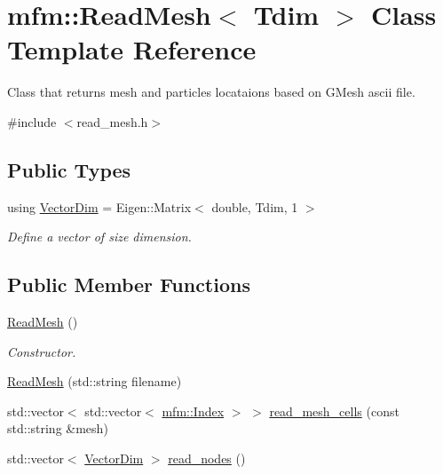 \hypertarget{classmfm_1_1_read_mesh}{}\section{mfm\+:\+:Read\+Mesh$<$ Tdim $>$ Class Template Reference}
\label{classmfm_1_1_read_mesh}


Class that returns mesh and particles locataions based on G\+Mesh ascii file.  




{\ttfamily \#include $<$read\+\_\+mesh.\+h$>$}

\subsection*{Public Types}
\begin{DoxyCompactItemize}
\item 
\mbox{\label{classmfm_1_1_read_mesh_a0dcd4f554ae2784be3fa53e547b2f6a9}} 
using \hyperlink{classmfm_1_1_read_mesh_a0dcd4f554ae2784be3fa53e547b2f6a9}{Vector\+Dim} = Eigen\+::\+Matrix$<$ double, Tdim, 1 $>$
\begin{DoxyCompactList}\small\item\em Define a vector of size dimension. \end{DoxyCompactList}\end{DoxyCompactItemize}
\subsection*{Public Member Functions}
\begin{DoxyCompactItemize}
\item 
\mbox{\label{classmfm_1_1_read_mesh_aca466723f1ea120fc76ec8cee2e62a98}} 
\hyperlink{classmfm_1_1_read_mesh_aca466723f1ea120fc76ec8cee2e62a98}{Read\+Mesh} ()
\begin{DoxyCompactList}\small\item\em Constructor. \end{DoxyCompactList}\item 
\hyperlink{classmfm_1_1_read_mesh_a205f0231970ab4511eb07ba7ecfcff47}{Read\+Mesh} (std\+::string filename)
\item 
std\+::vector$<$ std\+::vector$<$ \hyperlink{namespacemfm_a7d021c8caa1852f673d78358edc6b7f9}{mfm\+::\+Index} $>$ $>$ \hyperlink{classmfm_1_1_read_mesh_a7fe80e6e5bec7a835ffa03ef5ad92056}{read\+\_\+mesh\+\_\+cells} (const std\+::string \&mesh)
\item 
std\+::vector$<$ \hyperlink{classmfm_1_1_read_mesh_a0dcd4f554ae2784be3fa53e547b2f6a9}{Vector\+Dim} $>$ \hyperlink{classmfm_1_1_read_mesh_aad9a82f738f2f49010a5ca7c218855ce}{read\+\_\+nodes} ()
\end{DoxyCompactItemize}


